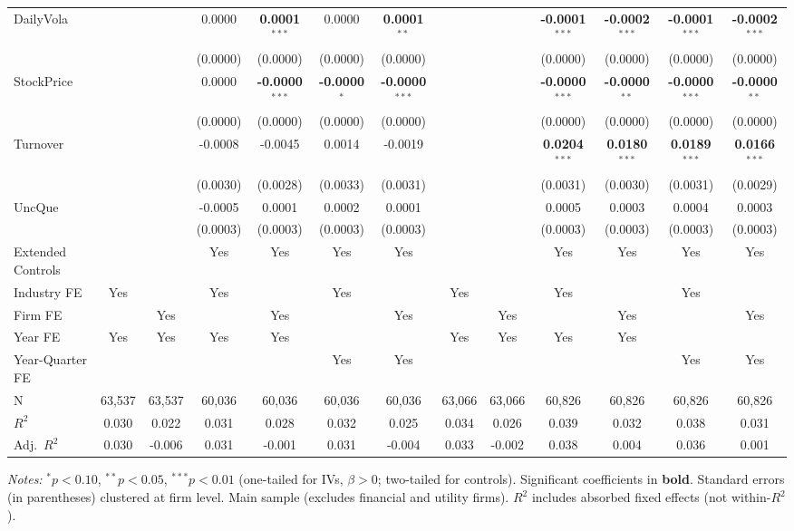 \documentclass[11pt,a4paper]{article}
\begin{document}
\begin{table}[htbp]
\begin{tabular}{lcccccccccccc}
DailyVola &  &  & 0.0000 & \textbf{0.0001}$^{***}$ & 0.0000 & \textbf{0.0001}$^{**}$ &  &  & \textbf{-0.0001}$^{***}$ & \textbf{-0.0002}$^{***}$ & \textbf{-0.0001}$^{***}$ & \textbf{-0.0002}$^{***}$ \\
 &  &  & (0.0000) & (0.0000) & (0.0000) & (0.0000) &  &  & (0.0000) & (0.0000) & (0.0000) & (0.0000) \\
StockPrice &  &  & 0.0000 & \textbf{-0.0000}$^{***}$ & \textbf{-0.0000}$^{*}$ & \textbf{-0.0000}$^{***}$ &  &  & \textbf{-0.0000}$^{***}$ & \textbf{-0.0000}$^{**}$ & \textbf{-0.0000}$^{***}$ & \textbf{-0.0000}$^{**}$ \\
 &  &  & (0.0000) & (0.0000) & (0.0000) & (0.0000) &  &  & (0.0000) & (0.0000) & (0.0000) & (0.0000) \\
Turnover &  &  & -0.0008 & -0.0045 & 0.0014 & -0.0019 &  &  & \textbf{0.0204}$^{***}$ & \textbf{0.0180}$^{***}$ & \textbf{0.0189}$^{***}$ & \textbf{0.0166}$^{***}$ \\
 &  &  & (0.0030) & (0.0028) & (0.0033) & (0.0031) &  &  & (0.0031) & (0.0030) & (0.0031) & (0.0029) \\
UncQue &  &  & -0.0005 & 0.0001 & 0.0002 & 0.0001 &  &  & 0.0005 & 0.0003 & 0.0004 & 0.0003 \\
 &  &  & (0.0003) & (0.0003) & (0.0003) & (0.0003) &  &  & (0.0003) & (0.0003) & (0.0003) & (0.0003) \\
\midrule
Extended Controls &  &  & Yes & Yes & Yes & Yes &  &  & Yes & Yes & Yes & Yes \\
Industry FE & Yes &  & Yes &  & Yes &  & Yes &  & Yes &  & Yes &  \\
Firm FE &  & Yes &  & Yes &  & Yes &  & Yes &  & Yes &  & Yes \\
Year FE & Yes & Yes & Yes & Yes &  &  & Yes & Yes & Yes & Yes &  &  \\
Year-Quarter FE &  &  &  &  & Yes & Yes &  &  &  &  & Yes & Yes \\
\midrule
N & 63,537 & 63,537 & 60,036 & 60,036 & 60,036 & 60,036 & 63,066 & 63,066 & 60,826 & 60,826 & 60,826 & 60,826 \\
$R^2$ & 0.030 & 0.022 & 0.031 & 0.028 & 0.032 & 0.025 & 0.034 & 0.026 & 0.039 & 0.032 & 0.038 & 0.031 \\
Adj.~$R^2$ & 0.030 & -0.006 & 0.031 & -0.001 & 0.031 & -0.004 & 0.033 & -0.002 & 0.038 & 0.004 & 0.036 & 0.001 \\
\bottomrule
\end{tabular}
\begin{minipage}{\linewidth}
\vspace{2pt}\scriptsize
\textit{Notes:} $^{*}p<0.10$, $^{**}p<0.05$, $^{***}p<0.01$ (one-tailed for IVs, $\beta > 0$; two-tailed for controls).
 Significant coefficients in \textbf{bold}.
 Standard errors (in parentheses) clustered at firm level.
 Main sample (excludes financial and utility firms).
 $R^2$ includes absorbed fixed effects (not within-$R^2$).
\end{minipage}
\end{table}
\end{document}
